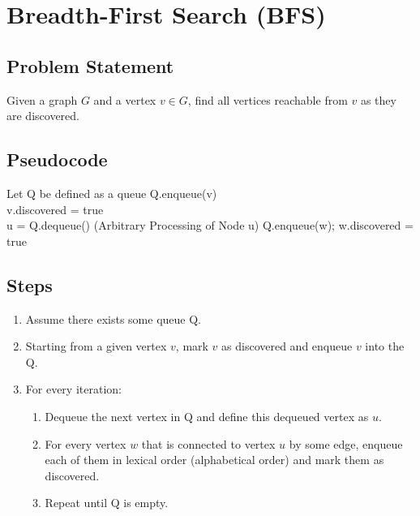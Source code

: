 \section{Breadth-First Search (BFS)}

\subsection*{Problem Statement}
Given a graph $G$ and a vertex $v \in G$, find all vertices reachable from $v$ as they are discovered.

\subsection*{Pseudocode}
\begin{algorithm}
	\begin{algorithmic}[1]
		\State Let Q be defined as a queue
		\State Q.enqueue(v)\\
		\State v.discovered = true\\
			\State u = Q.dequeue()
			\State (Arbitrary Processing of Node u)
					\State Q.enqueue(w);
					\State w.discovered = true
				\EndIf
			\EndFor
		\EndWhile
		\EndProcedure
	\end{algorithmic}
\end{algorithm}

\subsection*{Steps}
\begin{enumerate}
	\item Assume there exists some queue Q.
	\item Starting from a given vertex $v$, mark $v$ as discovered and enqueue $v$ into the Q.
	\item For every iteration:
	\begin{enumerate}
		\item Dequeue the next vertex in Q and define this dequeued vertex as $u$.
		\item For every vertex $w$ that is connected to vertex $u$ by some edge, enqueue each of them in lexical order (alphabetical order) and mark them as discovered.
		\item Repeat until Q is empty.
	\end{enumerate}
\end{enumerate}

